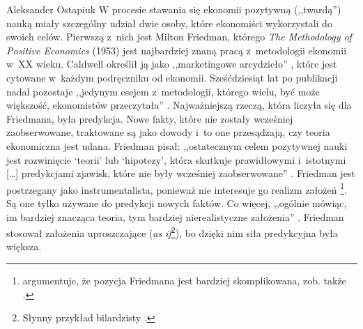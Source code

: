 \begin{artplenv}{Aleksander Ostapiuk}
W procesie stawania się ekonomii pozytywną (,,twardą'') nauką miały szczególny udział dwie osoby, które ekonomiści
wykorzystali do swoich celów. Pierwszą z~nich jest Milton Friedman, którego \textit{The Methodology of Positive
Economics} (1953) jest najbardziej znaną pracą z~metodologii ekonomii w~XX wieku. Caldwell określił ją jako
,,marketingowe arcydzieło''
\parencite[s.~173]{caldwell_beyond_1982},
które jest cytowane w~każdym podręczniku
od ekonomii. Sześćdziesiąt lat po publikacji nadal pozostaje ,,jedynym esejem z~metodologii, którego wielu, być może
większość, ekonomistów przeczytała''
\parencite[s.~162]{hausman_inexact_1992}.
Najważniejszą rzeczą, która
liczyła się dla Friedmana, była predykcja. Nowe fakty, które nie zostały wcześniej zaobserwowane, traktowane są jako
dowody i~to one przesądzają, czy teoria ekonomiczna jest udana. Friedman pisał: ,,ostatecznym celem pozytywnej nauki jest
rozwinięcie `teorii' lub `hipotezy', która skutkuje prawidłowymi i~istotnymi […] predykcjami zjawisk, które nie były
wcześniej zaobserwowane''
\parencite[s.~7]{friedman_essays_1953}.
Friedman jest postrzegany jako
instrumentalista, ponieważ nie interesuje go realizm założeń
\parencite{boland_critique_1979,caldwell_critique_1992}\footnote{%
\parencite{maki_unrealistic_2009}
argumentuje, że pozycja Friedmana jest bardziej skomplikowana,
zob. także
\parencite{hoyningen-huene_revisiting_2017}.
}. Są one tylko używane do predykcji nowych faktów. Co
więcej, ,,ogólnie mówiąc, im bardziej znacząca teoria, tym bardziej nierealistyczne założenia''
\parencite[s.~14]{friedman_essays_1953}.
Friedman stosował założenia uproszczające (\textit{as if}\footnote{Słynny przykład bilardzisty
\parencite[s.~13]{friedman_essays_1953}.
}), bo dzięki nim siła predykcyjna była większa. 


\end{artplenv}
